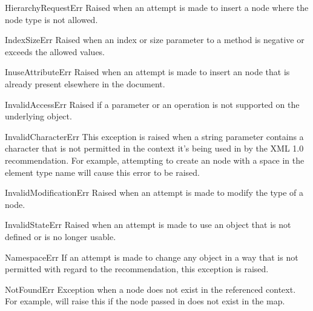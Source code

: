 \begin{excdesc}{HierarchyRequestErr}
  Raised when an attempt is made to insert a node where the node type
  is not allowed.
\end{excdesc}

\begin{excdesc}{IndexSizeErr}
  Raised when an index or size parameter to a method is negative or
  exceeds the allowed values.
\end{excdesc}

\begin{excdesc}{InuseAttributeErr}
  Raised when an attempt is made to insert an  node that
  is already present elsewhere in the document.
\end{excdesc}

\begin{excdesc}{InvalidAccessErr}
  Raised if a parameter or an operation is not supported on the
  underlying object.
\end{excdesc}

\begin{excdesc}{InvalidCharacterErr}
  This exception is raised when a string parameter contains a
  character that is not permitted in the context it's being used in by
  the XML 1.0 recommendation.  For example, attempting to create an
   node with a space in the element type name will
  cause this error to be raised.
\end{excdesc}

\begin{excdesc}{InvalidModificationErr}
  Raised when an attempt is made to modify the type of a node.
\end{excdesc}

\begin{excdesc}{InvalidStateErr}
  Raised when an attempt is made to use an object that is not defined or is no
  longer usable.
\end{excdesc}

\begin{excdesc}{NamespaceErr}
  If an attempt is made to change any object in a way that is not
  permitted with regard to the
  recommendation, this exception is raised.
\end{excdesc}

\begin{excdesc}{NotFoundErr}
  Exception when a node does not exist in the referenced context.  For
  example,  will raise this if
  the node passed in does not exist in the map.
\end{excdesc}

